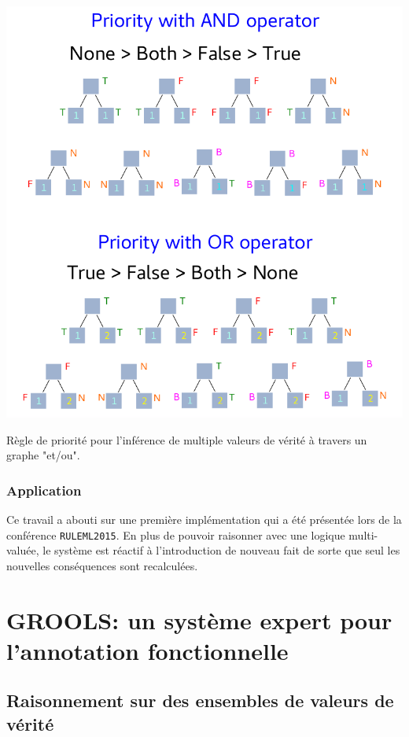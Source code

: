 \begin{refsegment}
\begin{shadedfigure}[H]
    \centering
    \includegraphics[width=\textwidth]{img/four_values_priorities_rules.pdf}
    \caption{ Règle de priorité pour l'inférence de multiple valeurs de vérité à travers un graphe "et/ou". }
    \label{fig:four_truth_values}
\end{shadedfigure}


\subsection{Application}
Ce travail a abouti sur une première implémentation qui a été présentée lors de la conférence \texttt{RULEML2015}. En plus de pouvoir raisonner avec une logique multi-valuée, le système est réactif à l'introduction de nouveau fait de sorte que seul les nouvelles conséquences sont recalculées.



\chapter{GROOLS: un système expert pour l'annotation fonctionnelle}


\section{Raisonnement sur des ensembles de valeurs de vérité}


\end{refsegment}
